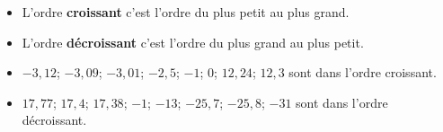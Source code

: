 \begin{definition}
    \begin{itemize}
        \item L'ordre \textbf{croissant} c'est l'ordre du plus petit au plus grand.
        \item L'ordre \textbf{décroissant} c'est l'ordre du plus grand au plus petit.
    \end{itemize}
\end{definition}

\begin{exemple*1}
    \begin{itemize}
        \item $-3,12$; $-3,09$; $-3,01$; $-2,5$; $-1$; $0$; $12,24$; $12,3$ sont dans l'ordre croissant.
        \item $17,77$; $17,4$; $17,38$; $-1$; $-13$; $-25,7$; $-25,8$; $-31$ sont dans l'ordre d\'ecroissant.
    \end{itemize}
\end{exemple*1}
